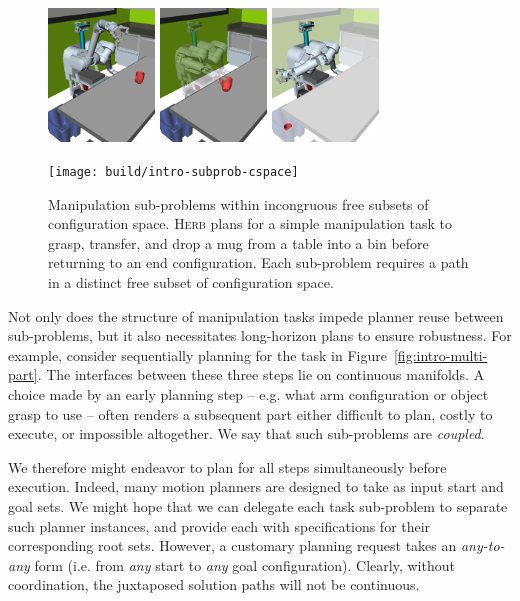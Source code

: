 \begin{figure}[t]
   \centering
   \includegraphics[height=1.4in]{figs/testherb-b.png}%
   \quad%
   \includegraphics[height=1.4in]{figs/testherb-c.png}%
   \quad%
   \includegraphics[height=1.4in]{figs/testherb-d.png}
   
   \texttt{[image: build/intro-subprob-cspace]}
   \caption{Manipulation sub-problems
      within incongruous free subsets
      of configuration space.
      \textsc{Herb} plans for a simple manipulation task
      to grasp, transfer, and drop a mug from a table into a bin
      before returning to an end configuration.
      Each sub-problem requires a path in a distinct free subset of
      configuration space.}
\end{figure}

Not only does the structure of manipulation tasks
impede planner reuse between sub-problems,
but it also necessitates long-horizon plans to ensure robustness.
For example,
consider sequentially planning for the task in
Figure~\ref{fig:intro-multi-part}.
The interfaces between these three steps lie on continuous manifolds.
A choice made by an early planning step
-- e.g. what arm configuration or object grasp to use --
often renders a subsequent part either difficult to plan,
costly to execute, or impossible altogether.
We say that such sub-problems are \emph{coupled}.

We therefore might endeavor to plan for all steps
simultaneously before execution.
Indeed,
many motion planners are designed to take as input
start and goal sets.
We might hope that we can delegate each task sub-problem to
separate such planner instances,
and provide each with specifications for their corresponding
root sets.
However,
a customary planning request takes an \emph{any-to-any} form
(i.e. from \emph{any} start to \emph{any} goal configuration).
Clearly, without coordination,
the juxtaposed solution paths will not be continuous.

